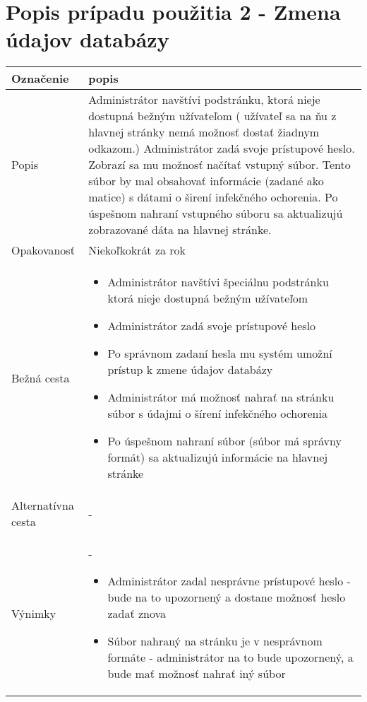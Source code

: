\documentclass[12pt,a4paper]{report}
\begin{document}
\section[Popis prípadu použitia 2 - Zmena údajov databázy]{\rmfamily\bfseries
	Popis prípadu použitia 2 - Zmena údajov databázy}
\begin{table}[h!]
	\centering
	\begin{tabular}{|>{\centering\arraybackslash}m{3in}|>{\centering\arraybackslash}m{3in}|}
		\hline
		\centering Označenie & popis \\ [0ex]
		\hline
		Popis & Administrátor navštívi podstránku, ktorá nieje dostupná bežným užívateľom (
		užívateľ sa na ňu z hlavnej stránky nemá možnosť dostať žiadnym odkazom.) Administrátor
		zadá svoje prístupové heslo. Zobrazí sa mu možnosť načítať vstupný súbor. Tento
		súbor by mal obsahovať informácie (zadané ako matice) s dátami o širení infekčného
		ochorenia. Po úspešnom nahraní vstupného súboru sa aktualizujú zobrazované
		dáta na hlavnej stránke.\\ [0ex]
		\hline
		Opakovanosť & Niekoľkokrát za rok \\ [0ex]
		\hline
		Bežná cesta & 	\begin{itemize}
							\item Administrátor navštívi špeciálnu podstránku ktorá nieje dostupná bežným užívateľom
							\item Administrátor zadá svoje prístupové heslo
							\item Po správnom zadaní hesla mu systém umožní prístup k zmene údajov databázy
							\item Administrátor má možnosť nahrať na stránku súbor s údajmi o šírení infekčného ochorenia
							\item Po úspešnom nahraní súbor (súbor má správny formát) sa aktualizujú informácie na hlavnej stránke
						\end{itemize} \\ [0ex]
		\hline
		Alternatívna cesta & - \\ [0ex]
		\hline
		Výnimky & - \begin{itemize}
						\item Administrátor zadal nesprávne prístupové heslo - bude na to upozornený a dostane možnosť heslo zadať znova
						\item Súbor nahraný na stránku je v nesprávnom formáte - administrátor na to bude upozornený, a bude mať možnosť nahrať iný súbor
					\end{itemize} \\ [0ex]
		\hline
	\end{tabular}
\end{table}
\end{document}
